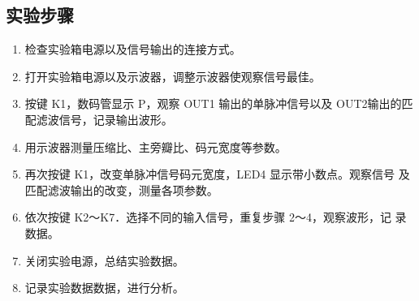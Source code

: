 \documentclass[12pt]{article}
\begin{document}
\subsection{实验步骤}
\begin{enumerate}
  \item 检查实验箱电源以及信号输出的连接方式。
\item 打开实验箱电源以及示波器，调整示波器使观察信号最佳。
\item 按键 K1，数码管显示 P，观察 OUT1 输出的单脉冲信号以及 OUT2输出的匹配滤波信号，记录输出波形。
\item 用示波器测量压缩比、主旁瓣比、码元宽度等参数。
\item 再次按键 K1，改变单脉冲信号码元宽度，LED4 显示带小数点。观察信号 及匹配滤波输出的改变，测量各项参数。
\item 依次按键 K2～K7．选择不同的输入信号，重复步骤 2～4，观察波形，记 录数据。
\item 关闭实验电源，总结实验数据。
\item 记录实验数据数据，进行分析。
\end{enumerate}
\end{document}
